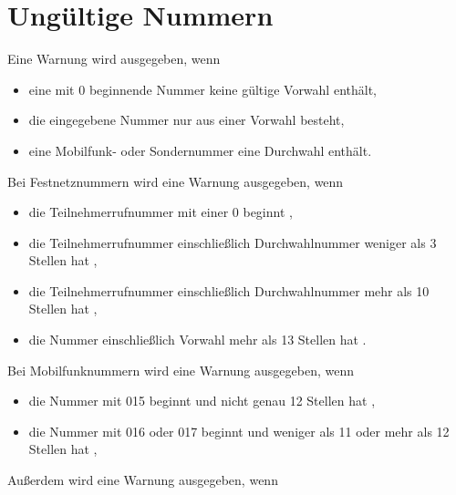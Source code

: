 \documentclass[numbers=noenddot]{scrreprt}
\newcommand{\UeberschriftUngueltig}{\section{Ungültige Nummern}}
\newcommand{\WarnungWenn}{Eine Warnung wird ausgegeben, wenn}
\begin{document}
\UeberschriftUngueltig
\WarnungWenn
\begin{itemize}
\item eine mit 0 beginnende Nummer keine gültige Vorwahl enthält,
\item die eingegebene Nummer nur aus einer Vorwahl besteht,
\item eine Mobilfunk- oder Sondernummer eine Durchwahl enthält.
\end{itemize}
Bei Festnetznummern wird eine Warnung ausgegeben, wenn
\begin{itemize}
\item die Teilnehmerrufnummer mit einer 0 beginnt \cite[6]{BNA-nummernplan},
\item die Teilnehmerrufnummer einschließlich Durchwahlnummer weniger als 3 Stellen hat \cite[6]{BNA-nummernplan},
\item die Teilnehmerrufnummer einschließlich Durchwahlnummer mehr als 10 Stellen hat \cite[3]{BNA-Struktur},
\item die Nummer einschließlich Vorwahl mehr als 13 Stellen hat \cite[3]{BNA-Struktur}.
\end{itemize}
Bei Mobilfunknummern wird eine Warnung ausgegeben, wenn
\begin{itemize}
\item die Nummer mit 015 beginnt und nicht genau 12 Stellen hat \cite[49\psq]{BNA-konzept},
\item die Nummer mit 016 oder 017 beginnt und weniger als 11 oder mehr als 12 Stellen hat \cite[50]{BNA-konzept},
\end{itemize}
Außerdem wird eine Warnung ausgegeben, wenn
\end{document}
